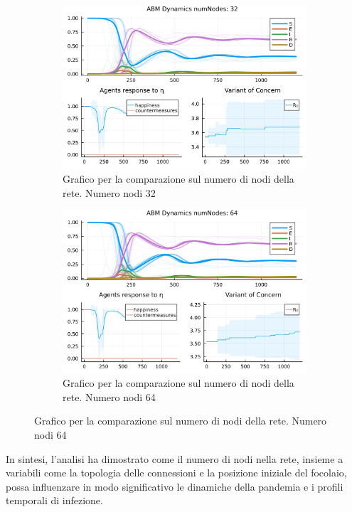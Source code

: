 \begin{figure}[!hb]
\begin{subfigure}[b]{0.45\textwidth}
		\includegraphics[width=\textwidth]{img/SocialNetworkABM_3_NN.jpg}
		\caption{Grafico per la comparazione sul numero di nodi della rete. Numero nodi 32}
		\label{fig:comparison_numberOfNodes_32}
	\end{subfigure}
	\hfill
	\begin{subfigure}[b]{0.45\textwidth}
		\centering
		\includegraphics[width=\textwidth]{img/SocialNetworkABM_4_NN.jpg}
		\caption{Grafico per la comparazione sul numero di nodi della rete. Numero nodi 64}
		\label{fig:comparison_numberOfNodes_64}
	\end{subfigure}
\end{figure}

In sintesi, l'analisi ha dimostrato come il numero di nodi nella rete, 
insieme a variabili come la topologia delle connessioni e la posizione 
iniziale del focolaio, possa influenzare in modo significativo le 
dinamiche della pandemia e i profili temporali di infezione.
\newpage

